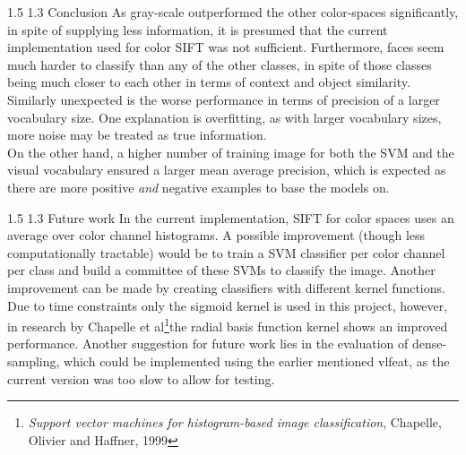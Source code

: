 \documentclass[12pt,a4paper]{amsart}
\makeatletter
\def\section{%
  \@startsection{section}{1}{\z@}%
  {1.5\linespacing\@plus\linespacing}%
  {1.3\linespacing}%
  {\bfseries\normalfont\scshape}
}
\makeatother
\begin{document}
\section{Conclusion}
As gray-scale outperformed the other color-spaces significantly, in spite of supplying less information, it is presumed that the current implementation used for color SIFT was not sufficient.  Furthermore, faces seem much harder to classify than any of the other classes, in spite of those classes being much closer to each other in terms of context and object similarity. \\
Similarly unexpected is the worse performance in terms of precision of a larger vocabulary size. One explanation is overfitting, as with larger vocabulary sizes, more noise may be treated as true information. \\
On the other hand, a higher number of training image for both the SVM and the visual vocabulary ensured a larger mean average precision, which is expected as there are more positive \textit{and} negative examples to base the models on.

\section{Future work}
In the current implementation, SIFT for color spaces uses an average over color channel histograms. A possible improvement (though less computationally tractable) would be to train a SVM classifier per color channel per class and build a committee of these SVMs to classify the image. Another improvement can be made by creating classifiers with different kernel functions. Due to time constraints only the sigmoid kernel is used in this project, however, in research by Chapelle et al\footnote{\textit{Support vector machines for histogram-based image classification}, Chapelle, Olivier and Haffner, 1999}the radial basis function kernel shows an improved performance. Another suggestion for future work lies in the evaluation of dense-sampling, which could be implemented using the earlier mentioned vlfeat, as the current version was too slow to allow for testing.



\end{document}

